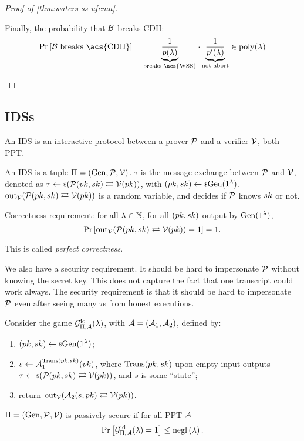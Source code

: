 \begin{proof}[Proof of \cref{thm:waters-ss-ufcma}]
\begin{itemize}
			Finally, the probability that $\B$ breaks \ac{CDH}:
			\begin{equation*}
				\Pr{\B \text{ breaks \acs{CDH}}} = \underbrace{\frac{1}{p(\lambda)}}_{\text{breaks \acs{WSS}}} \cdot \underbrace{\frac{1}{p'(\lambda)}}_{\text{not abort}} \in \poly(\lambda)
			\end{equation*}
	\end{itemize}
\end{proof}

\subsection{\aclp{IDS}}

An \ac{IDS} is an interactive protocol between a prover $\P$ and a verifier $\V$, both \ac{PPT}.

\begin{definition}
	An \ac{IDS} is a tuple $\Pi = (\Gen, \P, \V)$.
	$\tau$ is the message exchange between $\P$ and $\V$, denoted as $\tau \rand{(\P(\pk,\sk) \toandfrom \V(\pk))}$, with $(\pk, \sk) \rand{\Gen(1^{\lambda})}$.
	$\mathrm{out}_{\V}(\P(\pk, \sk) \toandfrom \V(\pk))$ is a random variable, and decides if $\P$ knows $\sk$ or not.

	Correctness requirement: for all $\lambda \in \NaturalsZ$, for all $(\pk, \sk)$ output by $\Gen(1^{\lambda})$,
	\begin{equation*}
		\Pr{ \mathrm{out}_{\V} (\P(\pk, \sk) \toandfrom \V(\pk)) = 1} = 1.
	\end{equation*}
	This is called \emph{perfect correctness}.
\end{definition}
We also have a security requirement.
It should be hard to impersonate $\P$ without knowing the secret key.
This does not capture the fact that one transcript could work always.
The security requirement is that it should be hard to impersonate $\P$ even after seeing many $\tau$s from honest executions.

\begin{definition}
	Consider the game $\IDSGame(\lambda)$, with $\Adv = (\Adv_1, \Adv_2)$, defined by:
	\begin{enumerate}
		\item $(\pk, \sk) \rand{\Gen(1^{\lambda})}$;
		\item $s \from \Adv_1^{\Trans(\pk, \sk)}(\pk)$, where $\Trans(\pk, \sk)$ upon empty input outputs $\tau \rand{(\P(\pk, \sk) \toandfrom \V(\pk))}$, and $s$ is some ``state'';
		\item return $\mathrm{out}_{\V}(\Adv_2(s, \pk) \toandfrom \V(\pk))$.
	\end{enumerate}
	$\Pi = (\Gen, \P, \V)$ is passively secure if for all \ac{PPT} $\Adv$
	\begin{equation*}
		\Pr{ \IDSGame(\lambda) = 1 } \le \negl{\lambda}. \qedhere
	\end{equation*}
\end{definition}

